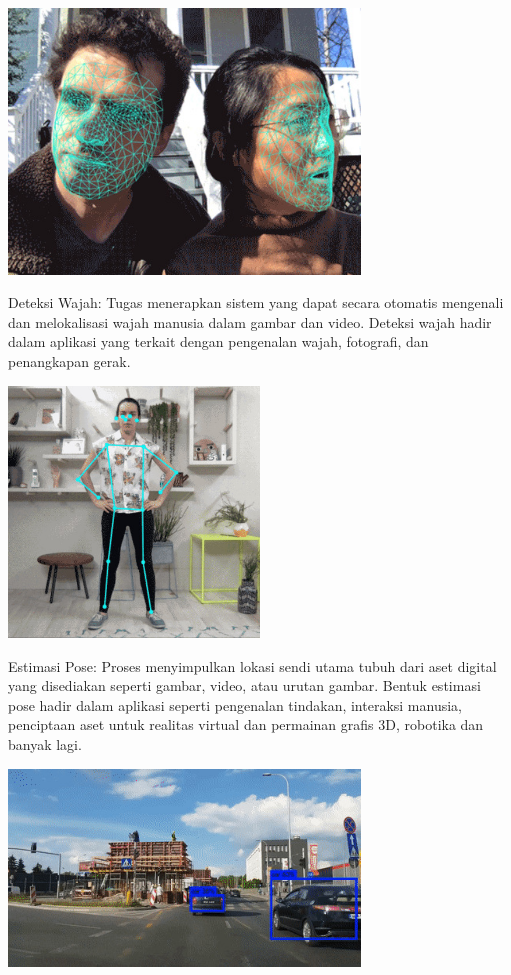 \begin{center}
	\includegraphics[width=0.70\textwidth]{gambar/face.jpg}
\end{center}
Deteksi Wajah: Tugas menerapkan sistem yang dapat secara otomatis mengenali dan melokalisasi wajah manusia dalam gambar dan video. Deteksi wajah hadir dalam aplikasi yang terkait dengan pengenalan wajah, fotografi, dan penangkapan gerak.\citep{ABeginne17}
\begin{center}
	\includegraphics[width=0.50\textwidth]{gambar/body.jpg}
\end{center}
Estimasi Pose: Proses menyimpulkan lokasi sendi utama tubuh dari aset digital yang disediakan seperti gambar, video, atau urutan gambar. Bentuk estimasi pose hadir dalam aplikasi seperti pengenalan tindakan, interaksi manusia, penciptaan aset untuk realitas virtual dan permainan grafis 3D, robotika dan banyak lagi.\citep{ABeginne17}
\begin{center}
	\includegraphics[width=0.70\textwidth]{gambar/car.jpg}
\end{center}
